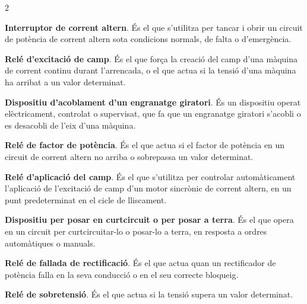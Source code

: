 \begin{multicols}{2}
\begin{list}{}
		\item[\textbf{52}]   
		\textbf{Interruptor de corrent altern}. És
		el que s'utilitza per tancar i obrir un circuit de potència de corrent altern sota condicions
		normals, de falta o d'emergència.
		
		\item[\textbf{53}]  
		\textbf{Relé d'excitació de camp}. És el
		que força la creació del camp d'una màquina de corrent continu
		durant l'arrencada, o el que actua si la tensió d'una màquina ha
		arribat a un valor determinat.
		
		\item[\textbf{54}]  
		\textbf{Dispositiu d'acoblament d'un engranatge giratori}. És un dispositiu operat elèctricament, controlat o supervisat, que fa que un engranatge giratori
		s'acobli o es desacobli de l'eix d'una màquina.
		
		\item[\textbf{55}]   
		\textbf{Relé de factor de potència}. És el que actua si el factor de potència en un circuit de corrent altern no arriba o
		sobrepassa un valor determinat.
		
		\item[\textbf{56}]   
		\textbf{Relé d'aplicació del camp}.
		És el que s'utilitza per controlar automàticament l'aplicació de l'excitació de camp d'un
		motor sincrònic de corrent altern, en un punt predeterminat en el cicle de lliscament.
		
		\item[\textbf{57}]  
		\textbf{Dispositiu per posar en  curtcircuit o per posar a terra}. És el que
		opera en un circuit per  curtcircuitar-lo  o
		posar-lo a terra, en resposta a ordres automàtiques o manuals.
		
		\item[\textbf{58}]   
		\textbf{Relé de fallada de rectificació}. És el que actua quan un rectificador de potència falla en la seva conducció o en el seu correcte bloqueig.
		
		\item[\textbf{59}]   
		\textbf{Relé de sobretensió}. És el que
		actua si la tensió supera un valor determinat.
		

\end{list}
\end{multicols}

